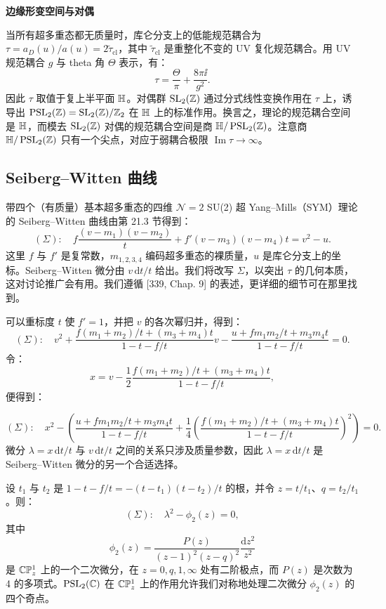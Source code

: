 \noindent\textbf{边缘形变空间与对偶}

当所有超多重态都无质量时，库仑分支上的低能规范耦合为 $\tau=a_D(u)/a(u)=2\tilde\tau_{\mathrm{cl}}$，其中 $\tilde\tau_{\mathrm{cl}}$ 是重整化不变的 UV 复化规范耦合。用 UV 规范耦合 $g$ 与 theta 角 $\Theta$ 表示，有：
\begin{equation}
\tau=\frac{\Theta}{\pi}+\frac{8\pi\ii}{g^2}.
\tag{21.10}
\end{equation}
因此 $\tau$ 取值于复上半平面 $\mathbb{H}$。对偶群 $\operatorname{SL}_2(\mathbb{Z})$ 通过分式线性变换作用在 $\tau$ 上，诱导出 $\operatorname{PSL}_2(\mathbb{Z})=\operatorname{SL}_2(\mathbb{Z})/\mathbb{Z}_2$ 在 $\mathbb{H}$ 上的标准作用。换言之，理论的规范耦合空间是 $\mathbb{H}$，而模去 $\operatorname{SL}_2(\mathbb{Z})$ 对偶的规范耦合空间是商 $\mathbb{H}/\operatorname{PSL}_2(\mathbb{Z})$。注意商 $\mathbb{H}/\operatorname{PSL}_2(\mathbb{Z})$ 只有一个尖点，对应于弱耦合极限 $\operatorname{Im}\tau\to\infty$。

\subsection{Seiberg–Witten 曲线}

带四个（有质量）基本超多重态的四维 $\mathcal{N}=2$ SU(2) 超 Yang–Mills（SYM）理论的 Seiberg–Witten 曲线由第 21.3 节得到：
\[
(\Sigma):\quad f\frac{(v-m_1)(v-m_2)}{t}+f'(v-m_3)(v-m_4)t=v^2-u.
\]
这里 $f$ 与 $f'$ 是复常数，$m_{1,2,3,4}$ 编码超多重态的裸质量，$u$ 是库仑分支上的坐标。Seiberg–Witten 微分由 $v\,\mathrm{d}t/t$ 给出。我们将改写 $\Sigma$，以突出 $\tau$ 的几何本质，这对讨论推广会有用。我们遵循 [339, Chap. 9] 的表述，更详细的细节可在那里找到。

可以重标度 $t$ 使 $f'=1$，并把 $v$ 的各次幂归并，得到：
\[
(\Sigma):\quad v^2+\frac{f(m_1+m_2)/t+(m_3+m_4)t}{1-t-f/t}v-\frac{u+fm_1m_2/t+m_3m_4t}{1-t-f/t}=0.
\]
令：
\[
x=v-\frac12\frac{f(m_1+m_2)/t+(m_3+m_4)t}{1-t-f/t},
\]
便得到：

\[
(\Sigma):\quad x^2-\left(\frac{u+fm_1m_2/t+m_3m_4t}{1-t-f/t}+\frac14\left(\frac{f(m_1+m_2)/t+(m_3+m_4)t}{1-t-f/t}\right)^2\right)=0.
\]
微分 $\lambda=x\,\mathrm{d}t/t$ 与 $v\,\mathrm{d}t/t$ 之间的关系只涉及质量参数，因此 $\lambda=x\,\mathrm{d}t/t$ 是 Seiberg–Witten 微分的另一个合适选择。

设 $t_1$ 与 $t_2$ 是 $1-t-f/t=-(t-t_1)(t-t_2)/t$ 的根，并令 $z=t/t_1$、$q=t_2/t_1$。则：
\begin{equation}
(\Sigma):\quad\lambda^2-\phi_2(z)=0,
\tag{21.11}
\end{equation}
其中
\[
\phi_2(z)=\frac{P(z)}{(z-1)^2(z-q)^2}\frac{\mathrm{d}z^2}{z^2}
\]
是 $\mathbb{C}\mathbb{P}^1_z$ 上的一个二次微分，在 $z=0,q,1,\infty$ 处有二阶极点，而 $P(z)$ 是次数为 4 的多项式。$\operatorname{PSL}_2(\mathbb{C})$ 在 $\mathbb{C}\mathbb{P}^1_z$ 上的作用允许我们对称地处理二次微分 $\phi_2(z)$ 的四个奇点。

